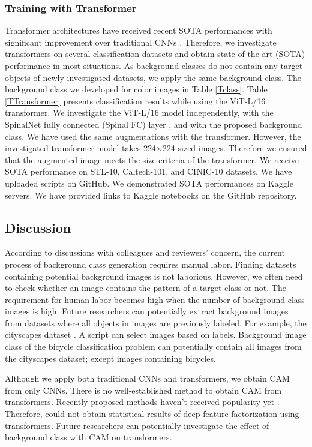 \documentclass{article}
\begin{document}
\subsubsection{Training with Transformer}
Transformer architectures have received recent SOTA performances with significant improvement over traditional CNNs \cite{ranftl2021vision, fan2021multiscale}. Therefore, we investigate transformers on several classification datasets and obtain state-of-the-art (SOTA) performance in most situations. As background classes do not contain any target objects of newly investigated datasets, we apply the same background class. The background class we developed for color images in Table \ref{Tclass}. Table \ref{TTransformer} presents classification results while using the ViT‑L/16 transformer. We investigate the ViT‑L/16 model independently, with the SpinalNet fully connected (Spinal FC) layer \cite{kabir2022spinalnet}, and with the proposed background class. 
We have used the same augmentations with the transformer. However, the investigated transformer model takes 224$\times$224 sized images. Therefore we ensured that the augmented image meets the size criteria of the transformer. 
We receive SOTA performance on STL-10, Caltech-101, and CINIC-10 datasets. We have uploaded scripts on GitHub. We demonstrated SOTA performances on Kaggle servers. We have provided links to Kaggle notebooks on the GitHub repository.



\subsection{Discussion}
According to discussions with colleagues and reviewers' concern, the current process of background class generation requires manual labor. Finding datasets containing potential background images is not laborious. However, we often need to check whether an image contains the pattern of a target class or not. The requirement for human labor becomes high when the number of background class images is high. Future researchers can potentially extract background images from datasets where all objects in images are previously labeled. For example, the cityscapes dataset \cite{cordts2016cityscapes}. A script can select images based on labels. Background image class of the bicycle classification problem can potentially contain all images from the cityscapes dataset; except images containing bicycles. 

Although we apply both traditional CNNs and transformers, we obtain CAM from only CNNs. There is no well-established method to obtain CAM from transformers. Recently proposed methods haven't received popularity yet \cite{li2023transcam, qiang2022attcat}. Therefore, could not obtain statistical results of deep feature factorization using transformers. Future researchers can potentially investigate the effect of background class with CAM on transformers.
\end{document}
